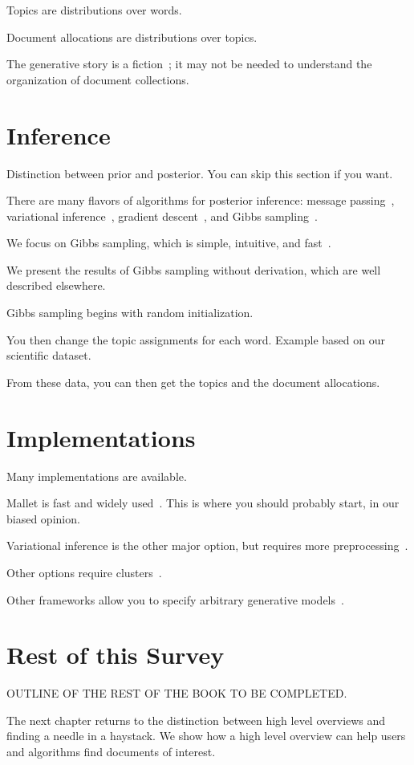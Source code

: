 Topics are distributions over words.

Document allocations are distributions over topics.

The generative story is a fiction~\citep{box-87}; it may not be needed
to understand the organization of document collections.

\section{Inference}

Distinction between prior and posterior.  You can skip this section if
you want.

There are many flavors of algorithms for posterior inference: message
passing~\citep{zeng-13}, variational inference~\citep{blei-03}, gradient
descent~\citep{hoffman-10}, and Gibbs sampling~\citep{griffiths-04}.

We focus on Gibbs sampling, which is simple, intuitive, and
fast~\citep{yao-09}.

We present the results of Gibbs sampling without derivation, which are
well described elsewhere.

Gibbs sampling begins with random initialization.

You then change the topic assignments for each word. Example based on
our scientific dataset. 

From these data, you can then get the topics and the document
allocations.

\section{Implementations}

Many implementations are available.

Mallet is fast and widely used~\citep{mallet}.  This is where you
should probably start, in our biased opinion.

Variational inference is the other major option, but requires more
preprocessing~\citep{blei-03,vw}.

Other options require clusters~\citep{Narayanamurthy-11,zhai-12}.

Other frameworks allow you to specify arbitrary generative
models~\citep{stan-software:2014}.



\section{Rest of this Survey}

OUTLINE OF THE REST OF THE BOOK TO BE COMPLETED.

The next chapter returns to the distinction between high level
overviews and finding a needle in a haystack.  We show how a high
level overview can help users and algorithms find documents of
interest.